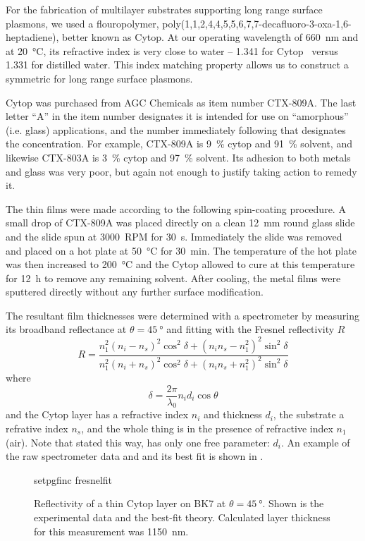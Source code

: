 For the fabrication of multilayer substrates supporting long range surface
plasmons, we used a flouropolymer,
poly(1,1,2,4,4,5,5,6,7,7-decafluoro-3-oxa-1,6-heptadiene), better known as
Cytop.  At our operating wavelength of \SI{660}{\nano\meter} and at
\SI{20}{\celsius}, its refractive index is very close to water --
1.341 for Cytop~\cite{mikevs2005synthesis} versus 1.331 for distilled
water.  This index matching property allows us to construct a symmetric for
long range surface plasmons.

Cytop was purchased from AGC Chemicals as item number CTX-809A.  The last
letter ``A'' in the item number designates it is intended for use on
``amorphous'' (i.e. glass) applications, and the number immediately
following that designates the concentration.  For example, CTX-809A is
\SI{9}{\percent} cytop and \SI{91}{\percent} solvent, and likewise CTX-803A
is \SI{3}{\percent} cytop and \SI{97}{\percent} solvent.  Its adhesion to
both metals and glass was very poor, but again not enough to justify taking
action to remedy it.

The thin films were made according to the following spin-coating procedure.
A small drop of CTX-809A was placed directly on a clean
\SI{12}{\milli\meter} round glass slide and the slide spun at
\SI{3000}{RPM} for \SI{30}{\second}.  Immediately the slide was removed and
placed on a hot plate at \SI{50}{\celsius} for \SI{30}{\minute}.  The
temperature of the hot plate was then increased to \SI{200}{\celsius} and
the Cytop allowed to cure at this temperature for \SI{12}{\hour} to remove
any remaining solvent.  After cooling, the metal films were sputtered
directly without any further surface modification.

The resultant film thicknesses were determined with a spectrometer by
measuring its broadband reflectance at $\theta=\SI{45}{\degree}$ and
fitting with the Fresnel reflectivity $R$
\begin{equation}
 R = \frac{n_1^2(n_i-n_s)^2 \cos^2\delta + (n_i n_s - n_1^2)^2\sin^2\delta}
          {n_1^2(n_i+n_s)^2 \cos^2\delta + (n_i n_s + n_1^2)^2\sin^2\delta}
          \label{eqn:fitfresnel}
\end{equation}
where
\begin{equation}
 \delta = \frac{2\pi}{\lambda_0} n_i d_i \cos \theta
\end{equation}
and the Cytop layer has a refractive index $n_i$ and thickness $d_i$, the
substrate a refrative index $n_s$, and the whole thing is in the presence
of refractive index $n_1$ (air).  Note that stated this way,
 has only one free parameter: $d_i$.  An example
of the raw spectrometer data and and its best fit is shown in
.

\begin{figure}
 \centering
 {setpgfinc}
 {fresnelfit}
 \caption{Reflectivity of a thin Cytop layer on BK7 at
 $\theta=\SI{45}{\degree}$.  Shown is the experimental data and the
 best-fit theory.  Calculated layer thickness for this measurement was
\SI{1150}{\nano\meter}.}
 \label{fig:fresnelfit}
\end{figure}
